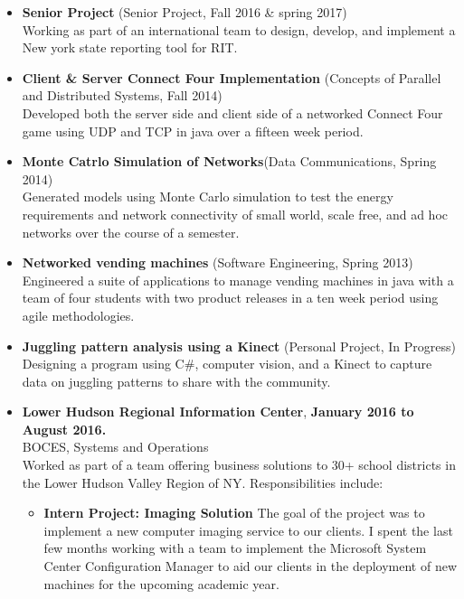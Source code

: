 \documentclass[10pt]{article}
\begin{document}
\begin{itemize}[topsep=1ex, itemsep=1ex, partopsep=0ex, parsep=0ex]
		\item[] {\bf Senior Project} (Senior Project, Fall 2016 \& spring 2017)\\
		Working as part of an international team to design, develop, and implement a New york state reporting tool for RIT.	
    	\item[] {\bf Client \& Server Connect Four Implementation} (Concepts of Parallel and Distributed Systems, Fall 2014)\\
    	Developed both the server side and client side of a networked Connect Four game using UDP and TCP in java over a fifteen week period.
	\item[] {\bf Monte Catrlo Simulation of Networks}(Data Communications, Spring 2014)\\
	Generated models using Monte Carlo simulation to test the energy requirements and network connectivity of small world, scale free, and ad hoc networks over the course of a semester.
	\item[] {\bf Networked vending machines} (Software Engineering, Spring 2013)\\
	Engineered a suite of applications to manage vending machines in java with a team of four students with two product releases in a ten week period using agile methodologies.
	\item[] {\bf Juggling pattern analysis using a Kinect} (Personal Project, In Progress)\\
    	Designing a program using C\#, computer vision, and a Kinect to capture data on juggling patterns to share with the community.
\end{itemize}
\vspace{.5ex}
\begin{itemize}[topsep=1ex, itemsep=1ex, partopsep=0ex, parsep=0ex]
	\item[] {{\bf Lower Hudson Regional Information Center}, \hfill {\bf January 2016 to August 2016.}}\\
	BOCES, Systems and Operations\\
	Worked as part of a team offering business solutions to 30+ school districts in the Lower Hudson Valley Region of NY. Responsibilities include:
	\begin{itemize} [topsep=.5ex, itemsep=.25ex, partopsep=0ex, parsep=.5ex]
		\item[] {\bf Intern Project: Imaging Solution}
		The goal of the project was to implement a new computer imaging service to our clients. I spent the last few months working with a team to implement the Microsoft System Center Configuration Manager to aid our clients in the deployment of new machines for the upcoming academic year. 
	\end{itemize}
\end{itemize}
\end{document}
